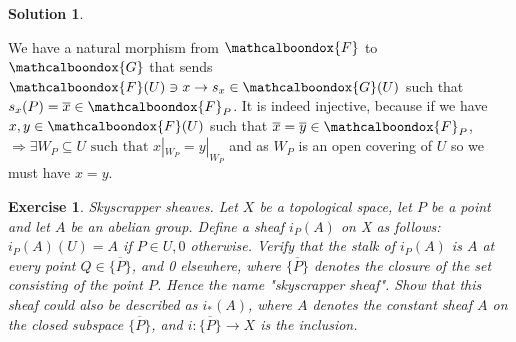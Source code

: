 \documentclass[12pt]{article}
\newcommand{\imp}{\ensuremath{\Rightarrow}}
\newtheorem{ex}{Exercise}[section]
\theoremstyle{definition}
\newtheorem*{sol}{Solution}
\newcommand{\sF}{\ensuremath{\mathcalboondox{F}}}
\newcommand{\sG}{\ensuremath{\mathcalboondox{G}}}
\begin{document}
\begin{sol}
\begin{enumerate}[label=\alph*)]
		We have a natural morphism from $\sF$ to $\sG$ that sends $\sF(U) \ni x \to s_x \in \sG(U)$ such that $s_x(P) = \overline{x} \in \sF_P$. It is indeed injective, because if we have $x,y \in \sF(U)$ such that $\overline{x} = \overline{y} \in \sF_P$, $\imp \exists W_P \subseteq U \text{ such that } x|_{W_P} = y|_{W_P}$ and as $W_P$ is an open covering of $U$ so we must have $x = y$.
	\end{enumerate}
\end{sol}

\begin{ex}
	Skyscrapper sheaves. Let $X$ be a topological space, let $P$ be a point and let $A$ be an abelian group. Define a sheaf $i_P(A)$ on X as follows: $i_P(A)(U) = A$ if $P \in U, 0$ otherwise. Verify that the stalk of $i_P(A)$ is $A$ at every point $Q \in \overline{\{P\}}$, and 0 elsewhere, where $\overline{\{P\}}$ denotes the closure of the set consisting of the point $P$. Hence the name "skyscrapper sheaf". Show that this sheaf could also be described as $i_{*}(A)$, where $A$ denotes the constant sheaf $A$ on the closed subspace $\overline{\{P\}}$, and $i: \overline{\{P\}} \to X$ is the inclusion.
\end{ex}
\end{document}
